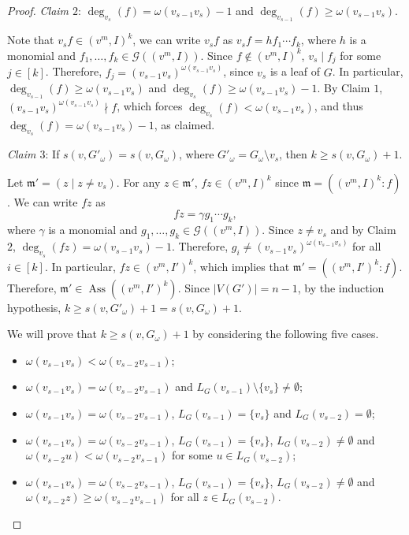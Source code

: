 \documentclass[12pt,amscd]{amsart}
\DeclareMathOperator{\ass}{Ass}
\theoremstyle{definition}
\def\m {\mathfrak m}
\begin{document}
\begin{proof}
\medskip

{\it Claim $2$}: $\deg_{v_s}(f) = \omega(v_{s-1}v_{s})-1$ and $\deg_{v_{s-1}}(f)\geqslant \omega(v_{s-1}v_{s})$. 

Note that  $v_sf\in (v^m,I)^k$, we can write $v_{s}f$ as $v_{s}f= hf_1\cdots f_k$, where $h$ is a monomial and $f_1,\ldots,f_k\in \mathcal{G}((v^m,I))$. Since  $f\notin (v^m,I)^k$,    $v_{s}\mid f_j$ for some $j\in [k]$. Therefore,  $f_j=(v_{s-1}v_{s})^{\omega(v_{s-1}v_{s})}$, since  $v_{s}$ is a leaf of $G$.
In particular, $\deg_{v_{s-1}}(f) \geqslant \omega(v_{s-1}v_{s})$ and $\deg_{v_{s}}(f) \geqslant \omega(v_{s-1}v_{s})-1$.  By Claim $1$, $(v_{s-1}v_{s})^{\omega(v_{s-1}v_{s})}\nmid f$, which forces $\deg_{v_{s}}(f) < \omega(v_{s-1}v_{s})$, and thus $\deg_{v_{s}}(f) = \omega(v_{s-1}v_{s})-1$, as claimed.


\medskip
{\it Claim $3$}: If $s(v,G'_\omega)=s(v,G_\omega)$,  where $G'_{\omega}=G_\omega\setminus v_s$, then $k\ge s(v,G_\omega)+1$. 

Let $\m'=(z\mid z\neq v_s)$. For any $z\in \m'$,  $fz\in (v^m,I)^k$ since $\m = ((v^m,I)^k \colon f)$. 
We can write $fz$ as 
\[
fz = \gamma g_1\cdots g_k,
\]
where $\gamma$ is a monomial and $g_1,\ldots,g_k\in \mathcal{G}((v^m,I))$. Since  $z\ne v_{s}$ and by  Claim $2$,  $\deg_{v_{s}}(fz)=\omega(v_{s-1}v_{s})-1$. Therefore,  $g_i\ne (v_{s-1}v_{s})^{\omega(v_{s-1}v_{s})}$ for all $i\in [k]$. In particular, $fz\in (v^m,I')^k$, which implies that  $\m'=((v^m,I')^k\colon f)$. Therefore, $\m'\in \ass((v^m,I')^k)$. Since $|V(G')| = n-1$, by the induction hypothesis, $k\geqslant s(v,G'_{\omega})+1=s(v,G_{\omega})+1$.

\medskip
 We will prove that $k\geqslant s(v,G_{\omega})+1$ by considering the following five cases.
\begin{itemize}
     \item[(i)]  $\omega(v_{s-1}v_{s}) < \omega(v_{s-2}v_{s-1})$;
      \item[(ii)]  $\omega(v_{s-1}v_{s}) = \omega(v_{s-2}v_{s-1})$ and $L_G(v_{s-1})\setminus \{v_s\}\ne \emptyset$;
    \item[(iii)] $\omega(v_{s-1}v_{s})=\omega(v_{s-2}v_{s-1})$,  $L_G(v_{s-1})=\{v_s\}$ and $L_G(v_{s-2})= \emptyset$;
    \item[(iv)] $\omega(v_{s-1}v_{s}) = \omega(v_{s-2}v_{s-1})$,  $L_G(v_{s-1})=\{v_s\}$,  $L_G(v_{s-2})\ne \emptyset$ and $\omega(v_{s-2}u) < \omega(v_{s-2}v_{s-1})$ for some $u\in L_G(v_{s-2})$; 
    \item[(v)] $\omega(v_{s-1}v_{s}) = \omega(v_{s-2}v_{s-1})$,  $L_G(v_{s-1})=\{v_s\}$,  $L_G(v_{s-2})\ne \emptyset$ and $\omega(v_{s-2}z) \ge \omega(v_{s-2}v_{s-1})$ for all $z\in L_G(v_{s-2})$.
\end{itemize}


\end{proof}
\end{document}

